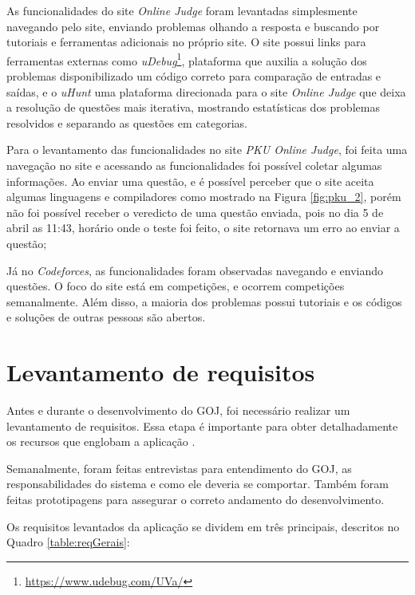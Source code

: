 As funcionalidades do site \textit{Online Judge} foram levantadas simplesmente navegando pelo site, enviando problemas olhando a resposta e buscando por tutoriais e ferramentas adicionais no próprio site. O site possui links para ferramentas externas como \textit{uDebug}\footnote{\url{https://www.udebug.com/UVa/}}, plataforma que auxilia a solução dos problemas disponibilizado um código correto para comparação de entradas e saídas, e o \textit{uHunt} uma plataforma direcionada para o site \textit{Online Judge} que deixa a resolução de questões mais iterativa, mostrando estatísticas dos problemas resolvidos e separando as questões em categorias. 

Para o levantamento das funcionalidades no site \textit{PKU Online Judge}, foi feita uma navegação no site e acessando as funcionalidades foi possível coletar algumas informações. Ao enviar uma questão, e é possível perceber que o site aceita algumas linguagens e compiladores como mostrado na Figura \ref{fig:pku_2}, porém não foi possível receber o veredicto de uma questão enviada, pois no dia 5 de abril as 11:43, horário onde o teste foi feito, o site retornava um erro ao enviar a questão;

Já no \textit{Codeforces}, as funcionalidades foram observadas navegando e enviando questões.  O foco do site está em competições, e ocorrem competições semanalmente. Além disso, a maioria dos problemas possui tutoriais e os códigos e soluções de outras pessoas são abertos.

\section{Levantamento de requisitos}
\label{sec:levantamentoDeRequisitos}

Antes e durante o desenvolvimento do GOJ, foi necessário realizar um levantamento de requisitos. Essa etapa é importante para obter detalhadamente os recursos que englobam a aplicação \cite{young2002recommended}.

Semanalmente, foram feitas entrevistas para entendimento do GOJ, as responsabilidades do sistema e como ele deveria se comportar. Também foram feitas prototipagens para assegurar o correto andamento do desenvolvimento.

Os requisitos levantados da aplicação se dividem em três principais, descritos no Quadro \ref{table:reqGerais}:

